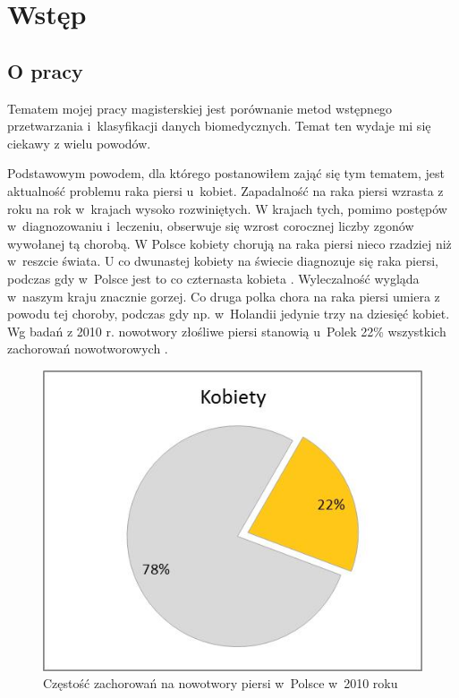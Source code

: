 \documentclass[../thesis.tex]{subfiles}
\begin{document}
\pagestyle{plain}

\chapter{Wstęp}
\label{intro}

\section{O pracy}

Tematem mojej pracy magisterskiej jest porównanie metod wstępnego przetwarzania i~klasyfikacji danych biomedycznych. Temat ten wydaje mi się ciekawy z wielu powodów.

Podstawowym powodem, dla którego postanowiłem zająć się tym tematem, jest aktualność problemu raka piersi u~kobiet. Zapadalność na raka piersi wzrasta z roku na rok w~krajach wysoko rozwiniętych. W krajach tych, pomimo postępów w~diagnozowaniu i~leczeniu, obserwuje się wzrost corocznej liczby zgonów wywołanej tą chorobą. W Polsce kobiety chorują na raka piersi nieco rzadziej niż w~reszcie świata. U co dwunastej kobiety na świecie diagnozuje się raka piersi, podczas gdy w~Polsce jest to co czternasta kobieta \cite{cancer_web_a}.  Wyleczalność wygląda w~naszym kraju znacznie gorzej. Co druga polka chora na raka piersi umiera z powodu tej choroby, podczas gdy np. w~Holandii jedynie trzy na dziesięć kobiet. Wg badań z 2010 r. nowotwory złośliwe piersi stanowią u~Polek 22\% wszystkich zachorowań nowotworowych \cite{cancer_web_b}.

\begin{figure}[h]
\centering
\includegraphics{zachorowalnosc.jpg}
\caption{Częstość zachorowań na nowotwory piersi w~Polsce w~2010 roku}
\label{intro:cancer_chart}
\end{figure}
\end{document}
